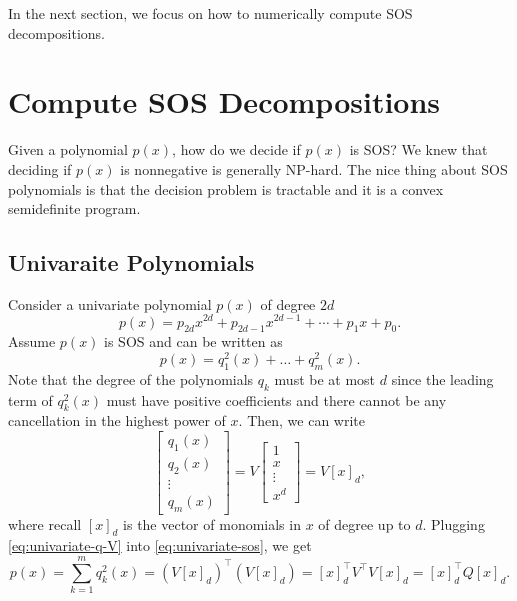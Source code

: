 \documentclass[
]{book}
\theoremstyle{definition}
\theoremstyle{definition}
\theoremstyle{definition}
\theoremstyle{definition}
\theoremstyle{remark}
\begin{document}
In the next section, we focus on how to numerically compute SOS decompositions.

\section{Compute SOS Decompositions}\label{compute-sos-decompositions}

Given a polynomial \(p(x)\), how do we decide if \(p(x)\) is SOS? We knew that deciding if \(p(x)\) is nonnegative is generally NP-hard. The nice thing about SOS polynomials is that the decision problem is tractable and it is a convex semidefinite program.

\subsection{Univaraite Polynomials}\label{univaraite-polynomials}

Consider a univariate polynomial \(p(x)\) of degree \(2d\)
\[
p(x) = p_{2d} x^{2d} + p_{2d-1} x^{2d-1} + \cdots + p_1 x + p_0.
\]
Assume \(p(x)\) is SOS and can be written as
\begin{equation}
p(x) = q_1^2(x) + \dots + q_m^2(x).
\label{eq:univariate-sos}
\end{equation}
Note that the degree of the polynomials \(q_k\) must be at most \(d\) since the leading term of \(q_k^2(x)\) must have positive coefficients and there cannot be any cancellation in the highest power of \(x\). Then, we can write
\begin{equation}
\begin{bmatrix} q_1(x) \\ q_2(x) \\ \vdots \\ q_m(x) \end{bmatrix} = V \begin{bmatrix} 1 \\ x \\ \vdots \\ x^d \end{bmatrix} = V [x]_d,
\label{eq:univariate-q-V}
\end{equation}
where recall \([x]_d\) is the vector of monomials in \(x\) of degree up to \(d\). Plugging \eqref{eq:univariate-q-V} into \eqref{eq:univariate-sos}, we get
\begin{equation}
p(x) = \sum_{k=1}^m q_k^2 (x) = (V [x]_d)^\top(V [x]_d) = [x]_d^\top V^\top V [x]_d = [x]_d^\top Q [x]_d.
\label{eq:univariate-sos-gram-Q}
\end{equation}
\end{document}
